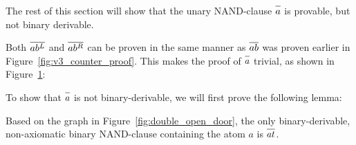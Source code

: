 The rest of this section will show that the unary NAND-clause $\ol{a}$ is provable, but not binary derivable.

Both $\ol{ab^L}$ and $\ol{ab^R}$ can be proven in the same manner as $\ol{ab}$ was proven earlier in Figure~\ref{fig:v3_counter_proof}.
This makes the proof of $\ol{a}$ trivial, as shown in Figure~\ref{fig:unary_nand_proof}:\par
\begin{figure}[!h]
  \centering
  \begin{prooftree*}
    \Hypo{\dots}
    \Hypo{\dots}
  \end{prooftree*}
  \caption{}
  \label{fig:unary_nand_proof}
\end{figure}
\FloatBarrier
To show that $\ol{a}$ is not binary-derivable, we will first prove the following lemma:
\begin{lemma}
  Based on the graph in Figure~\ref{fig:double_open_door}, the only binary-derivable, non-axiomatic binary NAND-clause containing the atom $a$ is $\ol{at}$.
  \label{thm:at_only_provable}
\end{lemma}

